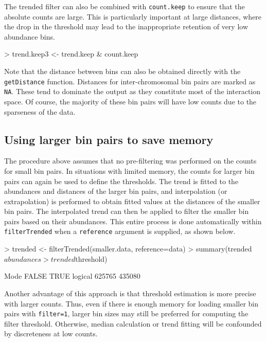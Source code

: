 \documentclass[12pt]{report}
\renewenvironment{Schunk}{\vspace{0pt}}{\vspace{0pt}}
\newcommand{\code}[1]{{\small\texttt{#1}}}
\begin{document}
The trended filter can also be combined with \code{count.keep} to ensure that the absolute counts are large.
This is particularly important at large distances, where the drop in the threshold may lead to the inappropriate retention of very low abundance bins.

\begin{Schunk}
\begin{Sinput}
> trend.keep3 <- trend.keep & count.keep
\end{Sinput}
\end{Schunk}

Note that the distance between bins can also be obtained directly with the \code{getDistance} function.
Distances for inter-chromosomal bin pairs are marked as \code{NA}.
These tend to dominate the output as they constitute most of the interaction space.
Of course, the majority of these bin pairs will have low counts due to the sparseness of the data.

\subsection{Using larger bin pairs to save memory}
The procedure above assumes that no pre-filtering was performed on the counts for small bin pairs.
In situations with limited memory, the counts for larger bin pairs can again be used to define the thresholds.
The trend is fitted to the abundances and distances of the larger bin pairs, and interpolation (or extrapolation) is performed to obtain fitted values at the distances of the smaller bin pairs.
The interpolated trend can then be applied to filter the smaller bin pairs based on their abundances.
This entire process is done automatically within \code{filterTrended} when a \code{reference} argument is supplied, as shown below.

\begin{Schunk}
\begin{Sinput}
> trended <- filterTrended(smaller.data, reference=data)
> summary(trended$abundances > trended$threshold)
\end{Sinput}
\begin{Soutput}
   Mode   FALSE    TRUE 
logical  625765  435080 
\end{Soutput}
\end{Schunk}

Another advantage of this approach is that threshold estimation is more precise with larger counts.
Thus, even if there is enough memory for loading smaller bin pairs with \code{filter=1}, larger bin sizes may still be preferred for computing the filter threshold.
Otherwise, median calculation or trend fitting will be confounded by discreteness at low counts.
\end{document}

